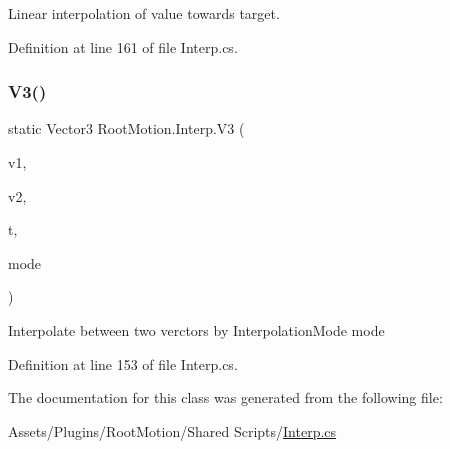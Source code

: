 Linear interpolation of value towards target. 



Definition at line 161 of file Interp.\+cs.

\mbox{\label{class_root_motion_1_1_interp_af692b44d59d139a46ff419dfceea9d63}} 
\subsubsection{\texorpdfstring{V3()}{V3()}}
{\footnotesize\ttfamily static Vector3 Root\+Motion.\+Interp.\+V3 (\begin{DoxyParamCaption}\item[{Vector3}]{v1,  }\item[{Vector3}]{v2,  }\item[{float}]{t,  }\item[{\mbox{\hyperlink{namespace_root_motion_ab1cbf9354347d1a3d238c06200006b9f}{Interpolation\+Mode}}}]{mode }\end{DoxyParamCaption})\hspace{0.3cm}{\ttfamily [static]}}



Interpolate between two verctors by Interpolation\+Mode mode 



Definition at line 153 of file Interp.\+cs.



The documentation for this class was generated from the following file\+:\begin{DoxyCompactItemize}
\item 
Assets/\+Plugins/\+Root\+Motion/\+Shared Scripts/\mbox{\hyperlink{_interp_8cs}{Interp.\+cs}}\end{DoxyCompactItemize}
